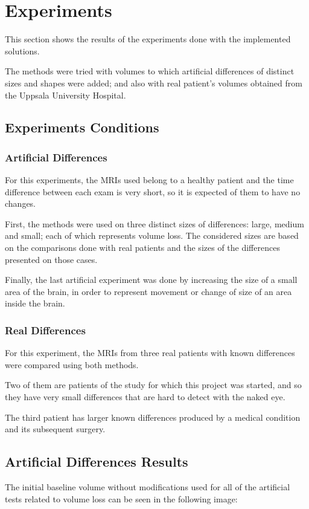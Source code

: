\chapter{Experiments}
This section shows the results of the experiments done with the
implemented solutions. 

The methods were tried with volumes to which artificial differences of
distinct sizes and shapes were added; and also with real patient's
volumes obtained from the Uppsala University Hospital.


\section{Experiments Conditions}

\subsection{Artificial Differences}
For this experiments, the MRIs used belong to a healthy patient and
the time difference between each exam is very short, so it is expected
of them to have no changes.

First, the methods were used on three distinct sizes of differences:
large, medium and small; each of which represents volume loss. The
considered sizes are based on the comparisons done with real patients
and the sizes of the differences presented on those cases.

Finally, the last artificial experiment was done by increasing the size
of a small area of the brain, in order to represent movement or change
of size of an area inside the brain.


\subsection{Real Differences}
For this experiment, the MRIs from three real patients with known
differences were compared using both methods.

Two of them are patients of the study for which this project was
started, and so they have very small differences that are hard to
detect with the naked eye.

The third patient has larger known differences produced by a medical
condition and its subsequent surgery.


\section{Artificial Differences Results}
The initial baseline volume without modifications used for all of the
artificial tests related to volume loss can be seen in the following
image:

